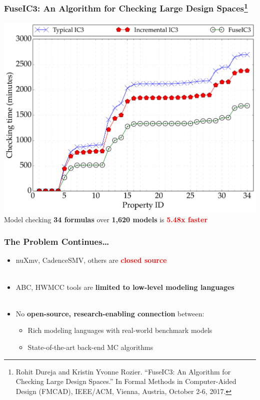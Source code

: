 \documentclass[dvipsnames,svgnames]{beamer}
\begin{document}
\begin{frame}
\frametitle{FuseIC3: An Algorithm for Checking Large Design Spaces\footnote{\tiny{Rohit Dureja and Kristin Yvonne Rozier. ``FuseIC3: An Algorithm for Checking Large Design Spaces.'' In Formal Methods in Computer-Aided Design (FMCAD), IEEE/ACM, Vienna, Austria, October 2-6, 2017.}}}

\vspace{-0.1in}
\centering
\includegraphics[height=0.75\textheight]{figs/heuristics_time.pdf}\\
Model checking \textcolor{OliveGreen}{\bf 34 formulas} over \textcolor{RedViolet}{\bf 1,620 models} is \textcolor{red}{\bf 5.48x faster}

\end{frame}


\begin{frame}
\frametitle{The Problem Continues\ldots}


\begin{itemize}
\item nuXmv, CadenceSMV, others are \textcolor{red}{\bf closed source} \\ \ \\
\item ABC, HWMCC tools are \textcolor{RedViolet}{\bf limited to low-level modeling languages} \\ \ \\
\item No \textcolor{OliveGreen}{\bf open-source, research-enabling connection} between:
  \begin{itemize}
  \item Rich modeling languages with real-world benchmark models
  \item State-of-the-art back-end MC algorithms
\end{itemize}
\end{itemize}

\end{frame}
\end{document}
